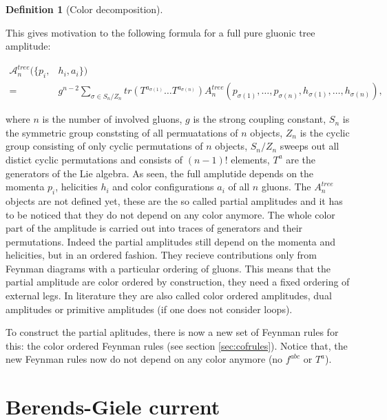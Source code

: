 \documentclass{article}
\theoremstyle{definition}
\newtheorem{definition}{Definition}[section]
\numberwithin{equation}{section}
\begin{document}
\begin{definition}[Color decomposition]
\label{def:decomp}

This gives motivation to the following formula for a full pure gluonic tree amplitude:

\begin{equation}
    \begin{aligned}
        \mathcal{A}_n^{tree}(\{p_i, &h_i, a_i\}) \\
        = &g^{n-2} \sum_{\sigma \in S_n/Z_n} tr (T^{a_{\sigma(1)}} \dots T^{a_{\sigma(n)}}) A_n^{tree}(p_{\sigma(1)}, \dots, p_{\sigma(n)}, h_{\sigma(1)}, \dots, h_{\sigma(n)}), \label{eq:decomp}
    \end{aligned}
\end{equation}

where $n$ is the number of involved gluons, $g$ is the strong coupling constant, $S_n$ is the symmetric group conststing of all permuatations of $n$ objects, $Z_n$ is the cyclic group consisting of only cyclic permutations of $n$ objects, $S_n/Z_n$ sweeps out all distict cyclic permutations and consists of $(n - 1)!$ elements, $T^a$ are the generators of the Lie algebra. As seen, the full amplutide depends on the momenta $p_i$, helicities $h_i$ and color configurations $a_i$ of all $n$ gluons. The $A_n^{tree}$ objects are not defined yet, these are the so called partial amplitudes and it has to be noticed that they do not depend on any color anymore. The whole color part of the amplitude is carried out into traces of generators and their permutations. Indeed the partial amplitudes still depend on the momenta and helicities, but in an ordered fashion. They recieve contributions only from Feynman diagrams with a particular ordering of gluons. This means that the partial amplitude are color ordered by construction, they need a fixed ordering of external legs. In literature they are also called color ordered amplitudes, dual amplitudes or primitive amplitudes (if one does not consider loops).

To construct the partial aplitudes, there is now a new set of Feynman rules for this: the color ordered Feynman rules (see section \ref{sec:cofrules}). Notice that, the new Feynman rules now do not depend on any color anymore (no $f^{abc}$ or $T^a$).

\end{definition}

\section{Berends-Giele current}
\label{sec:bgcurrent}
\end{document}
